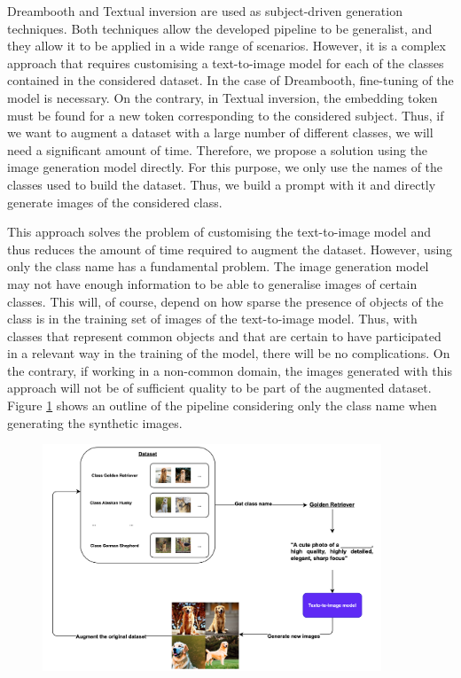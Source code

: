 Dreambooth and Textual inversion are used as subject-driven generation techniques. Both techniques allow the developed pipeline to be generalist, and they allow it to be applied in a wide range of scenarios. However, it is a complex approach that requires customising a text-to-image model for each of the classes contained in the considered dataset. In the case of Dreambooth, fine-tuning of the model is necessary. On the contrary, in Textual inversion, the embedding token must be found for a new token corresponding to the considered subject. Thus, if we want to augment a dataset with a large number of different classes, we will need a significant amount of time. Therefore, we propose a solution using the image generation model directly. For this purpose, we only use the names of the classes used to build the dataset. Thus, we build a prompt with it and directly generate images of the considered class.

This approach solves the problem of customising the text-to-image model and thus reduces the amount of time required to augment the dataset. However, using only the class name has a fundamental problem. The image generation model may not have enough information to be able to generalise images of certain classes. This will, of course, depend on how sparse the presence of objects of the class is in the training set of images of the text-to-image model. Thus, with classes that represent common objects and that are certain to have participated in a relevant way in the training of the model, there will be no complications. On the contrary, if working in a non-common domain, the images generated with this approach will not be of sufficient quality to be part of the augmented dataset. Figure \ref{fig:controlNetP} shows an outline of the pipeline considering only the class name when generating the synthetic images.

\begin{figure}
    \centering
    \includegraphics[width=0.9\textwidth]{Pictures/controlNetP.png} 
    \caption{}
    \label{fig:controlNetP}
\end{figure}
